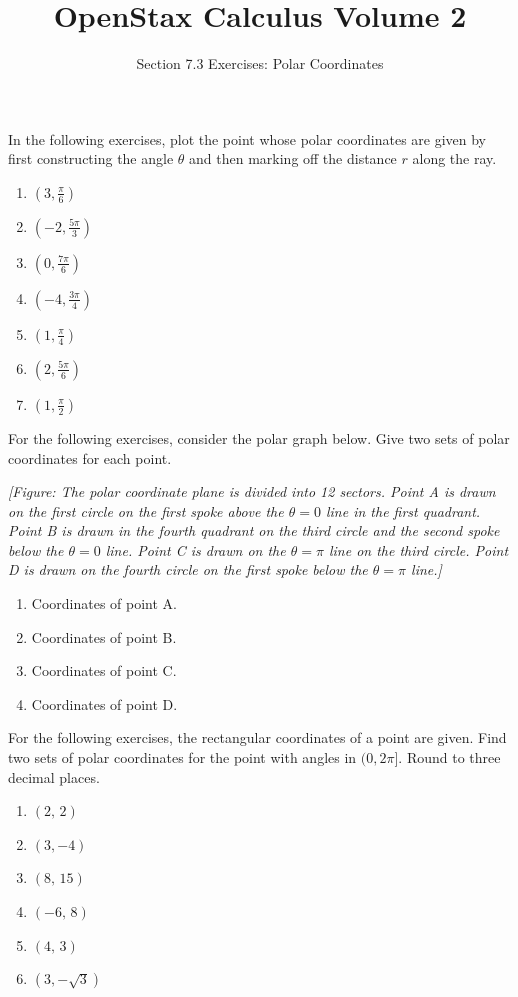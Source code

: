 \documentclass{exercises}
\title{OpenStax Calculus Volume 2}
\subtitle{Section 7.3 Exercises: Polar Coordinates}
\author{}
\date{}
\begin{document}
\maketitle


In the following exercises, plot the point whose polar coordinates are given by first constructing the angle $\theta$ and then marking off the distance $r$ along the ray.

\begin{enumerate}[start=1]
\item $(3,\frac{\pi}{6})$
\item $(-2,\frac{5\pi}{3})$
\item $(0,\frac{7\pi}{6})$
\item $(-4,\frac{3\pi}{4})$
\item $(1,\frac{\pi}{4})$
\item $(2,\frac{5\pi}{6})$
\item $(1,\frac{\pi}{2})$
\end{enumerate}

For the following exercises, consider the polar graph below. Give two sets of polar coordinates for each point.


\textit{[Figure: The polar coordinate plane is divided into 12 sectors. Point A is drawn on the first circle on the first spoke above the $\theta=0$ line in the first quadrant. Point B is drawn in the fourth quadrant on the third circle and the second spoke below the $\theta=0$ line. Point C is drawn on the $\theta=\pi$ line on the third circle. Point D is drawn on the fourth circle on the first spoke below the $\theta=\pi$ line.]}

\begin{enumerate}[resume]
\item Coordinates of point A.
\item Coordinates of point B.
\item Coordinates of point C.
\item Coordinates of point D.
\end{enumerate}

For the following exercises, the rectangular coordinates of a point are given. Find two sets of polar coordinates for the point with angles in $(0,2\pi]$. Round to three decimal places.

\begin{enumerate}[resume]
\item $(2,\,2)$
\item $(3,-4)$
\item $(8,\,15)$
\item $(-6,\,8)$
\item $(4,\,3)$
\item $(3,-\sqrt{3})$
\end{enumerate}
\end{document}

